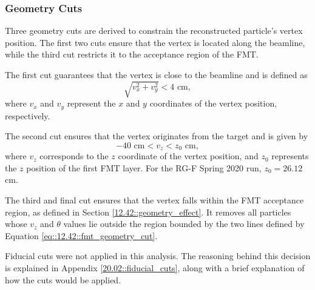 \subsubsection{Geometry Cuts}
\label{13.22::geometry_cuts}
    Three geometry cuts are derived to constrain the reconstructed particle's vertex position.
    The first two cuts ensure that the vertex is located along the beamline, while the third cut restricts it to the acceptance region of the FMT.

    The first cut guarantees that the vertex is close to the beamline and is defined as
    \begin{equation*}
        \sqrt{v_x^2 + v_y^2} < 4 \text{ cm},
    \end{equation*}
    where $v_x$ and $v_y$ represent the $x$ and $y$ coordinates of the vertex position, respectively.

    The second cut ensures that the vertex originates from the target and is given by
    \begin{equation*}
        -40 \text{ cm} < v_z < z_0 \text{ cm},
    \end{equation*}
    where $v_z$ corresponds to the $z$ coordinate of the vertex position, and $z_0$ represents the $z$ position of the first FMT layer.
    For the RG-F Spring 2020 run, $z_0 = 26.12$ cm.

    The third and final cut ensures that the vertex falls within the FMT acceptance region, as defined in Section \ref{12.42::geometry_effect}.
    It removes all particles whose $v_z$ and $\theta$ values lie outside the region bounded by the two lines defined by Equation \eqref{eq::12.42::fmt_geometry_cut}.

    Fiducial cuts were not applied in this analysis.
    The reasoning behind this decision is explained in Appendix \ref{20.02::fiducial_cuts}, along with a brief explanation of how the cuts would be applied.
